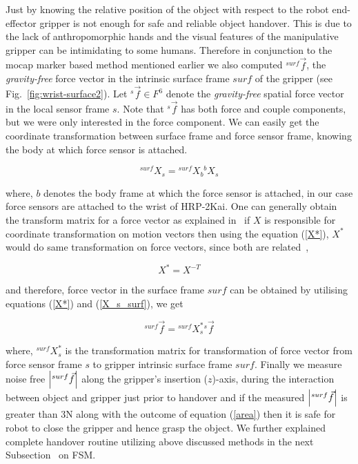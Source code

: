 Just by knowing the relative position of the object with respect to the robot end-effector gripper is not enough for safe and reliable object handover. This is due to the lack of anthropomorphic hands and the visual features of the manipulative gripper can be intimidating to some humans. Therefore in conjunction to the mocap marker based method mentioned earlier we also computed ${}^{surf}\vec{f}$, the \textit{gravity-free} force vector in the intrinsic surface frame $surf$ of the gripper (see Fig.~\ref{fig:wrist-surface2}). Let ${}^s\vec{f}\in F^6$ denote the \textit{gravity-free} spatial force vector in the local sensor frame $s$. Note that ${}^s\vec{f}$ has both force and couple components, but we were only interested in the force component. We can easily get the coordinate transformation between surface frame and force sensor frame, knowing the body at which force sensor is attached.

\begin{equation}\label{X_s_surf}
    {}^{surf}X_{s} = {}^{surf}X_{b} {}^{b}X_s
\end{equation}

where, $b$ denotes the body frame at which the force sensor is attached, in our case force sensors are attached to the wrist of HRP-2Kai. One can generally obtain the transform matrix for a force vector as explained in~\cite{featherstone2014rigid} if $X$ is responsible for coordinate transformation on motion vectors then using the equation (\ref{X*}), $X^{*}$ would do same transformation on force vectors, since both are related~\cite{featherstone2014rigid},

\begin{equation}\label{X*}
    X^{*} = X^{-T}
\end{equation}

and therefore, force vector in the surface frame $surf$ can be obtained by utilising equations (\ref{X*}) and (\ref{X_s_surf}), we get

\begin{equation}\label{force surf}
    {}^{surf}\vec{f} = {}^{surf}X_{s}^{*} {}^s\vec{f}
\end{equation}

where, ${}^{surf}X_{s}^{*}$ is the transformation matrix for transformation of force vector from force sensor frame $s$ to gripper intrinsic surface frame $surf$. Finally we measure noise free $\abs{{}^{surf}\vec{f}}$ along the gripper's insertion ($z$)-axis, during the interaction between object and gripper just prior to handover and if the measured $\abs{{}^{surf}\vec{f}}$ is greater than 3N along with the outcome of equation (\ref{area}) then it is safe for robot to close the gripper and hence grasp the object. We further explained complete handover routine utilizing above discussed methods in the next Subsection~ on FSM.

